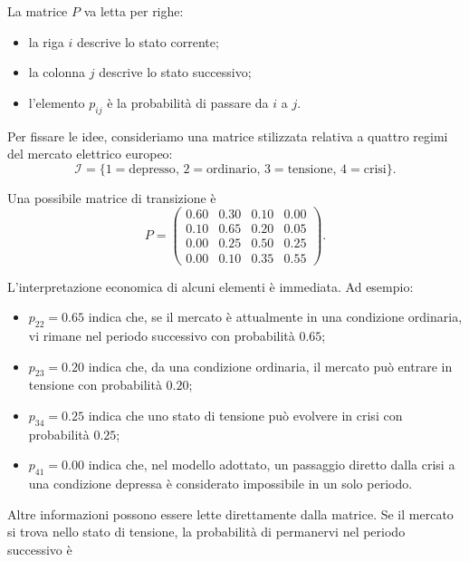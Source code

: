 La matrice \(P\) va letta per righe:

\begin{itemize}

\item la riga \(i\) descrive lo stato corrente;

\item la colonna \(j\) descrive lo stato successivo;

\item l'elemento \(p_{ij}\) \`{e} la probabilit\`{a} di passare da \(i\)
a \(j\).

\end{itemize}

Per fissare le idee, consideriamo una matrice stilizzata relativa a
quattro regimi del mercato elettrico europeo:
\[
\mathcal{I}
=
\{
1=\text{depresso},
\,
2=\text{ordinario},
\,
3=\text{tensione},
\,
4=\text{crisi}
\}.
\]

Una possibile matrice di transizione \`{e}
\[
P=
\begin{pmatrix}
0.60 & 0.30 & 0.10 & 0.00\\
0.10 & 0.65 & 0.20 & 0.05\\
0.00 & 0.25 & 0.50 & 0.25\\
0.00 & 0.10 & 0.35 & 0.55
\end{pmatrix}.
\]

L'interpretazione economica di alcuni elementi \`{e} immediata. Ad
esempio:

\begin{itemize}

\item \(p_{22}=0.65\) indica che, se il mercato \`{e} attualmente in una
condizione ordinaria, vi rimane nel periodo successivo con probabilit\`{a}
\(0.65\);

\item \(p_{23}=0.20\) indica che, da una condizione ordinaria, il mercato
pu\`{o} entrare in tensione con probabilit\`{a} \(0.20\);

\item \(p_{34}=0.25\) indica che uno stato di tensione pu\`{o} evolvere
in crisi con probabilit\`{a} \(0.25\);

\item \(p_{41}=0.00\) indica che, nel modello adottato, un passaggio
diretto dalla crisi a una condizione depressa \`{e} considerato
impossibile in un solo periodo.

\end{itemize}

Altre informazioni possono essere lette direttamente dalla matrice.
Se il mercato si trova nello stato di tensione, la probabilit\`{a} di
permanervi nel periodo successivo \`{e}

